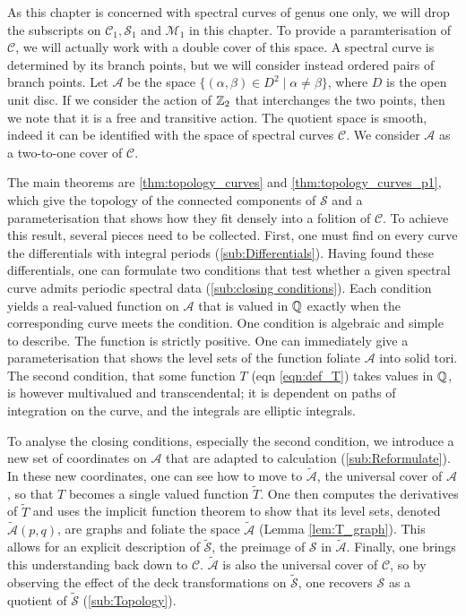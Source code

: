 As this chapter is concerned with spectral curves of genus one only, we will drop the subscripts on $\mathcal{C}_1,\mathcal{S}_1$ and $\mathcal{M}_1$ in this chapter. To provide a paramterisation of $\mathcal{C}$, we will actually work with a double cover of this space. A spectral curve is determined by its branch points, but we will consider instead ordered pairs of branch points. Let $\mathcal{A}$ be the space $\{ (α,β) \in D^2 \mid α \neq β \}$, where $D$ is the open unit disc. If we consider the action of $\mathbb{Z}_2$ that interchanges the two points, then we note that it is a free and transitive action. The quotient space is smooth, indeed it can be identified with the space of spectral curves $\mathcal{C}$. We consider $\mathcal{A}$ as a two-to-one cover of $\mathcal{C}$.

The main theorems are \ref{thm:topology_curves} and \ref{thm:topology_curves_p1}, which give the topology of the connected components of $\mathcal{S}$ and a parameterisation that shows how they fit densely into a folition of $\mathcal{C}$. To achieve this result, several pieces need to be collected. First, one must find on every curve the differentials with integral periods (\textsection\ref{sub:Differentials}). Having found these differentials, one can formulate two conditions that test whether a given spectral curve admits periodic spectral data (\textsection\ref{sub:closing conditions}). Each condition yields a real-valued function on $\mathcal{A}$ that is valued in $\mathbb{Q}$ exactly when the corresponding curve meets the condition. One condition is algebraic and simple to describe. The function is strictly positive. One can immediately give a parameterisation that shows the level sets of the function foliate $\mathcal{A}$ into solid tori. The second condition, that some function $T$ (eqn \ref{eqn:def_T}) takes values in $\mathbb{Q}$, is however multivalued and transcendental; it is dependent on paths of integration on the curve, and the integrals are elliptic integrals.

To analyse the closing conditions, especially the second condition, we introduce a new set of coordinates on $\mathcal{A}$ that are adapted to calculation (\textsection\ref{sub:Reformulate}). In these new coordinates, one can see how to move to $\mathcal{\tilde{A}}$, the universal cover of $\mathcal{A}$, so that $T$ becomes a single valued function $\tilde{T}$. One then computes the derivatives of $\tilde{T}$ and uses the implicit function theorem to show that its level sets, denoted $\mathcal{\tilde{A}}(p,q)$, are graphs and foliate the space $\mathcal{\tilde{A}}$ (Lemma \ref{lem:T_graph}). This allows for an explicit description of $\mathcal{\tilde{S}}$, the preimage of $\mathcal{S}$ in $\mathcal{\tilde{A}}$. Finally, one brings this understanding back down to $\mathcal{C}$. $\mathcal{\tilde{A}}$ is also the universal cover of $\mathcal{C}$, so by observing the effect of the deck transformations on $\mathcal{\tilde{S}}$, one recovers $\mathcal{S}$ as a quotient of $\mathcal{\tilde{S}}$ (\textsection\ref{sub:Topology}).


